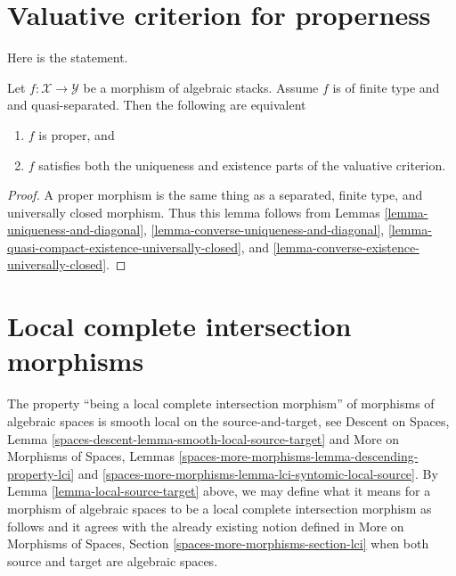 \section{Valuative criterion for properness}
\label{section-valutive-criterion-properness}

\noindent
Here is the statement.

\begin{lemma}
\label{lemma-criterion-proper}
Let $f : \mathcal{X} \to \mathcal{Y}$ be a morphism of algebraic stacks.
Assume $f$ is of finite type and and quasi-separated.
Then the following are equivalent
\begin{enumerate}
\item $f$ is proper, and
\item $f$ satisfies both the uniqueness and existence parts
of the valuative criterion.
\end{enumerate}
\end{lemma}

\begin{proof}
A proper morphism is the same thing as a separated, finite type, and
universally closed morphism. Thus this lemma follows from Lemmas
\ref{lemma-uniqueness-and-diagonal},
\ref{lemma-converse-uniqueness-and-diagonal},
\ref{lemma-quasi-compact-existence-universally-closed}, and
\ref{lemma-converse-existence-universally-closed}.
\end{proof}







\section{Local complete intersection morphisms}
\label{section-lci}

\noindent
The property ``being a local complete intersection morphism''
of morphisms of algebraic spaces is
smooth local on the source-and-target, see
Descent on Spaces, Lemma \ref{spaces-descent-lemma-smooth-local-source-target}
and
More on Morphisms of Spaces, Lemmas
\ref{spaces-more-morphisms-lemma-descending-property-lci} and
\ref{spaces-more-morphisms-lemma-lci-syntomic-local-source}.
By Lemma \ref{lemma-local-source-target} above, we may define what it
means for a morphism of algebraic spaces to be
a local complete intersection morphism as follows and it agrees with the
already existing notion defined in
More on Morphisms of Spaces,
Section \ref{spaces-more-morphisms-section-lci}
when both source and target are algebraic spaces.

